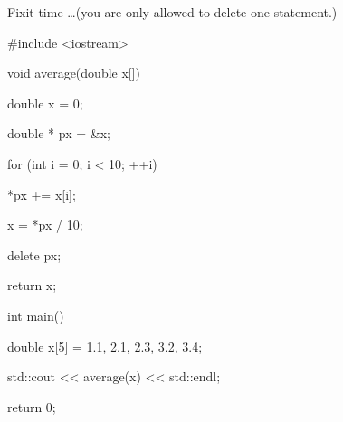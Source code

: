 Fixit time \ldots (you are only allowed to delete one statement.)



\begin{consolethree}[escapeinside=||]

#include <iostream>



void average(double x[])

{

    double x = 0;

    double * px = &x;

    for (int i = 0; i < 10; ++i)

    {

        *px += x[i];

    }



    x = *px / 10;

    delete px;

    return x;

}



int main()

{

    double x[5] = {1.1, 2.1, 2.3, 3.2, 3.4};

    std::cout << average(x) << std::endl;

    return 0;

}

\end{consolethree}

